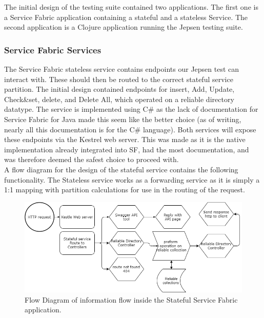 \documentclass[a4paper,10pt,titlepage]{report}
\begin{document}
    The initial design of the testing suite contained two applications. The first one is a Service Fabric application containing a stateful and a stateless Service. The second application is a Clojure application running the Jepsen testing suite.

    \subsubsection{Service Fabric Services}

    The Service Fabric stateless service contains endpoints our Jepsen test can interact with. These should then be routed to the correct stateful service partition. The initial design contained endpoints for insert, Add, Update, Check\&set, delete, and Delete All, which operated on a reliable directory datatype. The service is implemented using C\# as the lack of documentation for Service Fabric for Java made this seem like the better choice (as of writing, nearly all this documentation is for the C\# language). Both services will expose these endpoints via the Kestrel web server. This was made as it is the native implementation already integrated into SF, had the most documentation, and was therefore deemed the safest choice to proceed with.\\
    \vspace{5mm}
    A flow diagram for the design of the stateful service contains the following functionality. The Stateless service works as a forwarding service as it is simply a 1:1 mapping with partition calculations for use in the routing of the request. \\
    \vspace{5mm}
    \begin{figure}[h!]
        \centering
            \includegraphics[scale=0.5]{images/Design_Stateful_service_1.0.drawio.png}
        \caption{Flow Diagram of information flow inside the Stateful Service Fabric application.}
    \end{figure}
\end{document}
